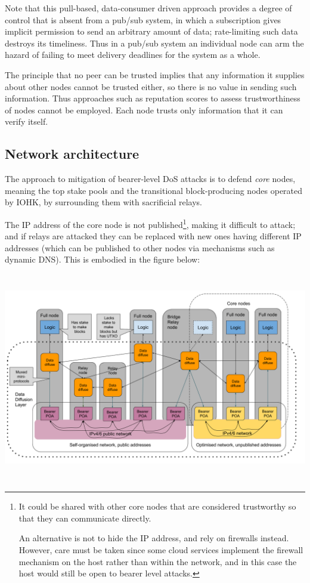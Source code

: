 \documentclass[11pt,a4paper]{article}
\begin{document}
Note that this pull-based, data-consumer driven approach provides a
degree of control that is absent from a pub/sub system, in which a
subscription gives implicit permission to send an arbitrary amount of
data; rate-limiting such data destroys its timeliness. Thus in a pub/sub
system an individual node can arm the hazard of failing to meet delivery
deadlines for the system as a whole.

The principle that no peer can be trusted implies that any information
it supplies about other nodes cannot be trusted either, so there is no
value in sending such information. Thus approaches such as reputation
scores to assess trustworthiness of nodes cannot be employed. Each node
trusts only information that it can verify itself.

\subsection{Network architecture}
\label{network-architecture}

The approach to mitigation of bearer-level DoS attacks is to defend
\emph{core} nodes, meaning the top stake pools and the transitional
block-producing nodes operated by IOHK, by surrounding them with
sacrificial relays.

The IP address of the core node is not published\footnote{It could be
  shared with other core nodes that are considered trustworthy so that
  they can communicate directly.

  An alternative is not to hide the IP address, and rely on firewalls
  instead. However, care must be taken since some cloud services
  implement the firewall mechanism on the host rather than within the
  network, and in this case the host would still be open to bearer level
  attacks.}, making it difficult to attack; and if relays are attacked
they can be replaced with new ones having different IP addresses (which
can be published to other nodes via mechanisms such as dynamic DNS).
This is embodied in the figure below:

\includegraphics[width=6.26772in,height=3.61111in]{./media/image5.png}
\end{document}
